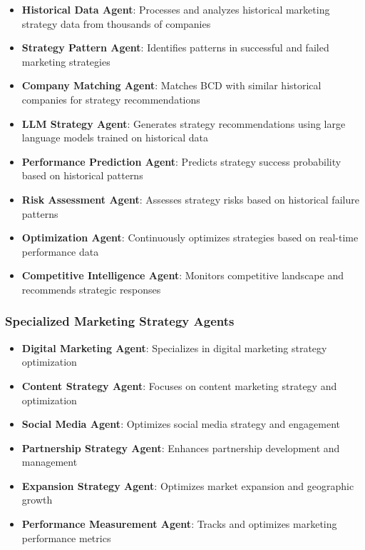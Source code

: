 \begin{itemize}
    \item \textbf{Historical Data Agent}: Processes and analyzes historical marketing strategy data from thousands of companies
    \item \textbf{Strategy Pattern Agent}: Identifies patterns in successful and failed marketing strategies
    \item \textbf{Company Matching Agent}: Matches BCD with similar historical companies for strategy recommendations
    \item \textbf{LLM Strategy Agent}: Generates strategy recommendations using large language models trained on historical data
    \item \textbf{Performance Prediction Agent}: Predicts strategy success probability based on historical patterns
    \item \textbf{Risk Assessment Agent}: Assesses strategy risks based on historical failure patterns
    \item \textbf{Optimization Agent}: Continuously optimizes strategies based on real-time performance data
    \item \textbf{Competitive Intelligence Agent}: Monitors competitive landscape and recommends strategic responses
\end{itemize}

\subsubsection{Specialized Marketing Strategy Agents}

\begin{itemize}
    \item \textbf{Digital Marketing Agent}: Specializes in digital marketing strategy optimization
    \item \textbf{Content Strategy Agent}: Focuses on content marketing strategy and optimization
    \item \textbf{Social Media Agent}: Optimizes social media strategy and engagement
    \item \textbf{Partnership Strategy Agent}: Enhances partnership development and management
    \item \textbf{Expansion Strategy Agent}: Optimizes market expansion and geographic growth
    \item \textbf{Performance Measurement Agent}: Tracks and optimizes marketing performance metrics
\end{itemize}

